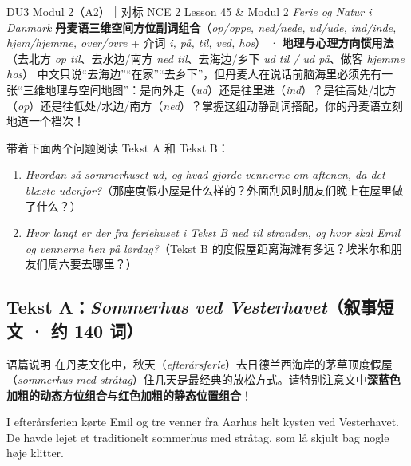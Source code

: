 {DU3 Modul 2（A2）｜对标 NCE 2 Lesson 45 \& Modul 2 \textit{Ferie og Natur i Danmark}}
{\textbf{丹麦语三维空间方位副词组合}（\textit{op/oppe, ned/nede, ud/ude, ind/inde, hjem/hjemme, over/ovre} + 介词 \textit{i, på, til, ved, hos}） · \textbf{地理与心理方向惯用法}（去北方 \textit{op til}、去水边/南方 \textit{ned til}、去海边/乡下 \textit{ud til / ud på}、做客 \textit{hjemme hos}）}
{中文只说“去海边”“在家”“去乡下”，但丹麦人在说话前脑海里必须先有一张“三维地理与空间地图”：是向外走（\textit{ud}）还是往里进（\textit{ind}）？是往高处/北方（\textit{op}）还是往低处/水边/南方（\textit{ned}）？掌握这组动静副词搭配，你的丹麦语立刻地道一个档次！}

\begin{foerduleaeser}
带着下面两个问题阅读 Tekst A 和 Tekst B：
\begin{enumerate}
  \item \textit{Hvordan så sommerhuset ud, og hvad gjorde vennerne om aftenen, da det blæste udenfor?}（那座度假小屋是什么样的？外面刮风时朋友们晚上在屋里做了什么？）
  \item \textit{Hvor langt er der fra feriehuset i Tekst B ned til stranden, og hvor skal Emil og vennerne hen på lørdag?}（Tekst B 的度假屋距离海滩有多远？埃米尔和朋友们周六要去哪里？）
\end{enumerate}
\end{foerduleaeser}


\subsection*{Tekst A：\textit{Sommerhus ved Vesterhavet}（叙事短文 · 约 140 词）}

\begin{tipbox}{语篇说明}
在丹麦文化中，秋天（\textit{efterårsferie}）去日德兰西海岸的茅草顶度假屋（\textit{sommerhus med stråtag}）住几天是最经典的放松方式。请特别注意文中\textbf{\color{NCDNavy}深蓝色加粗的动态方位组合}与\textbf{\color{NCDRed}红色加粗的静态位置组合}！
\end{tipbox}

I efterårsferien kørte Emil og tre venner fra Aarhus helt  kysten ved Vesterhavet. De havde lejet et traditionelt sommerhus med stråtag, som lå skjult bag nogle høje klitter.

